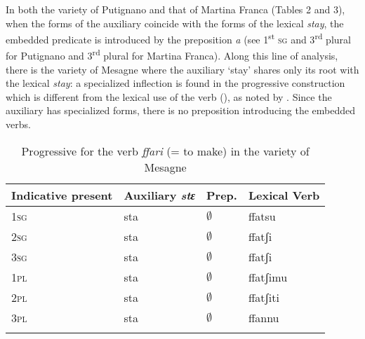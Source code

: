 \documentclass[output=paper]{langsci/langscibook}
\begin{document}
In both the variety of Putignano and that of Martina Franca (Tables 2 and 3), when the forms of the auxiliary coincide with the forms of the lexical \textit{stay}, the embedded predicate is introduced by the preposition \textit{a} (see 1\textsuperscript{st} \textsc{sg} and 3\textsuperscript{rd} plural for Putignano and 3\textsuperscript{rd} plural for Martina Franca). Along this line of analysis, there is the variety of Mesagne where the auxiliary ‘stay’ shares only its root with the lexical \textit{stay}: a specialized inflection is found in the progressive construction which is different from the lexical use of the verb (), as noted by \citet[I:691]{Manzini2005}. Since the auxiliary has specialized forms, there is no preposition introducing the embedded verbs.

\begin{table}
\begin{tabular}{*{4}{l}}
\lsptoprule
Indicative present & Auxiliary \textit{stɛ} & Prep. & Lexical Verb\\\midrule
\scshape 1sg & sta & ${\emptyset}$ & ffatsu\\
\scshape 2sg & sta & ${\emptyset}$ & ffatʃi\\
\scshape 3sg & sta & ${\emptyset}$ & ffatʃi\\
\scshape 1pl & sta & ${\emptyset}$ & ffatʃimu\\
\scshape 2pl & sta & ${\emptyset}$ & ffatʃiti\\
\scshape 3pl & sta & ${\emptyset}$ & ffannu\\
\lspbottomrule
\end{tabular}
\caption{Progressive for the verb \textit{ffari} (= to make) in the variety of Mesagne}
\label{tab:lorusso:4}
\end{table}
\end{document}
